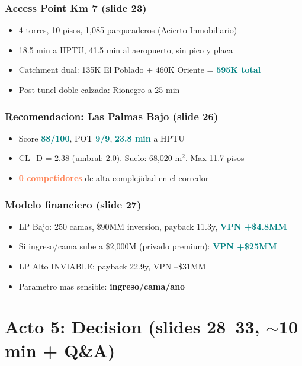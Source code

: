 \documentclass[11pt, a4paper]{article}
\newcommand{\hl}[1]{\textcolor{teal}{\textbf{#1}}}
\newcommand{\dg}[1]{\textcolor{coral}{\textbf{#1}}}
\begin{document}
\subsubsection{Access Point Km 7 (slide 23)}
\begin{itemize}[nosep]
  \item 4 torres, 10 pisos, 1,085 parqueaderos (Acierto Inmobiliario)
  \item 18.5 min a HPTU, 41.5 min al aeropuerto, sin pico y placa
  \item Catchment dual: 135K El Poblado + 460K Oriente = \hl{595K total}
  \item Post tunel doble calzada: Rionegro a 25 min
\end{itemize}

\subsubsection{Recomendacion: Las Palmas Bajo (slide 26)}
\begin{itemize}[nosep]
  \item Score \hl{88/100}, POT \hl{9/9}, \hl{23.8 min} a HPTU
  \item CL\_D = 2.38 (umbral: 2.0). Suelo: 68,020 m$^2$. Max 11.7 pisos
  \item \dg{0 competidores} de alta complejidad en el corredor
\end{itemize}

\subsubsection{Modelo financiero (slide 27)}
\begin{itemize}[nosep]
  \item LP Bajo: 250 camas, \$90MM inversion, payback 11.3y, \hl{VPN +\$4.8MM}
  \item Si ingreso/cama sube a \$2,000M (privado premium): \hl{VPN +\$25MM}
  \item LP Alto INVIABLE: payback 22.9y, VPN --\$31MM
  \item Parametro mas sensible: \textbf{ingreso/cama/ano}
\end{itemize}

\section{Acto 5: Decision (slides 28--33, $\sim$10 min + Q\&A)}
\end{document}
